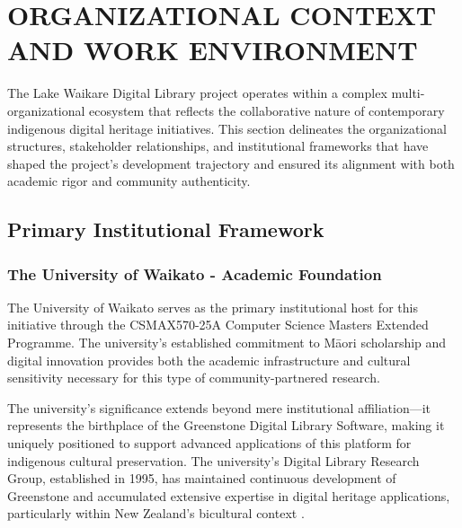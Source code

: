 ﻿%

\section{ORGANIZATIONAL CONTEXT AND WORK ENVIRONMENT}

The Lake Waikare Digital Library project operates within a complex multi-organizational ecosystem that reflects the collaborative nature of contemporary indigenous digital heritage initiatives. This section delineates the organizational structures, stakeholder relationships, and institutional frameworks that have shaped the project's development trajectory and ensured its alignment with both academic rigor and community authenticity.

\subsection{Primary Institutional Framework}

\subsubsection{The University of Waikato - Academic Foundation}

The University of Waikato serves as the primary institutional host for this initiative through the CSMAX570-25A Computer Science Masters Extended Programme. The university's established commitment to M\=aori scholarship and digital innovation provides both the academic infrastructure and cultural sensitivity necessary for this type of community-partnered research.

The university's significance extends beyond mere institutional affiliation—it represents the birthplace of the Greenstone Digital Library Software, making it uniquely positioned to support advanced applications of this platform for indigenous cultural preservation. The university's Digital Library Research Group, established in 1995, has maintained continuous development of Greenstone and accumulated extensive expertise in digital heritage applications, particularly within New Zealand's bicultural context \cite{witten_2000}.

